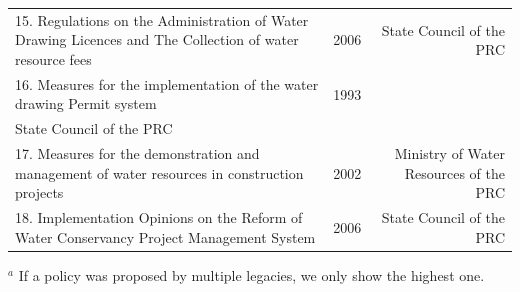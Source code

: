 \documentclass[9pt,twoside,lineno]{pnas-new}
\begin{document}
\begin{table}
\begin{tabular}{lrr}
    15. Regulations on the Administration of Water Drawing Licences and The Collection of water resource fees & 2006 & State Council of the PRC \\
    16. Measures for the implementation of the water drawing Permit system & 1993 \\ State Council of the PRC \\
    17. Measures for the demonstration and management of water resources in construction projects & 2002 & Ministry of Water Resources of the PRC \\
    18. Implementation Opinions on the Reform of Water Conservancy Project Management System & 2006 & State Council of the PRC \\

    \bottomrule
    \end{tabular}

    \footnotesize{$^a$ If a policy was proposed by multiple legacies, we only show the highest one.}
\end{table}



\FloatBarrier




\end{document}
